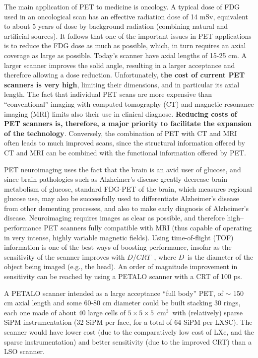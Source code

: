 \documentclass[review]{elsarticle}
\begin{document}
The main application of PET to medicine is oncology. A typical dose of FDG used in an oncological scan has an effective radiation dose of 14 mSv, equivalent to about 5 years of dose by background radiation (combining natural and artificial sources). It follows that one of the important issues in PET applications is to reduce the FDG dose as much as possible, which, in turn requires an axial coverage as large as possible. Today's scanner have axial lengths of 15-25 cm. A larger scanner improves the solid angle, resulting in a larger acceptance and therefore allowing a dose reduction. Unfortunately, {\bf the cost of current PET scanners is very high}, limiting their dimensions, and in particular its axial length. The fact that  individual PET scans are more expensive than ``conventional'' imaging with computed tomography (CT) and magnetic resonance imaging (MRI) limits also their use in clinical diagnose. {\bf Reducing costs of PET scanners is, therefore, a major priority to facilitate the expansion of the technology}. Conversely, the combination of PET with CT and MRI often leads to much improved scans, since the structural information offered by CT and MRI can be combined with the functional information offered by PET. 

PET neuroimaging uses the fact that the brain is an avid user of glucose, and since brain pathologies such as Alzheimer's disease greatly decrease brain metabolism of glucose, standard FDG-PET of the brain, which measures regional glucose use, may also be successfully used to differentiate Alzheimer's disease from other dementing processes, and also to make early diagnosis of Alzheimer's disease. Neuroimaging requires images as clear as possible, and therefore high--performance PET scanners fully compatible with MRI (thus capable of operating in very intense, highly variable magnetic fields). Using time-of-flight (TOF) information is one of the best ways of boosting performance, insofar as the sensitivity of the scanner improves with $D/CRT$~, where $D$~is the diameter of the object being imaged (e.g., the head). An order of magnitude improvement in sensitivity can be reached by using a PETALO scanner with a CRT of 100 ps. 

A PETALO scanner intended as a large acceptance ``full body'' PET, of $\sim$ 150 cm axial length and some 60-80 cm diameter could be built stacking 30 rings, each one made of about 40 large cells of $5 \times 5 \times 5$~cm$^3$~with (relatively) sparse SiPM instrumentation (32 SiPM per face, for a total of 64 SiPM per LXSC). The scanner would have lower cost (due to the comparatively low cost of LXe, and the sparse instrumentation) and better sensitivity (due to the  improved CRT) than a LSO scanner.  
\end{document}

